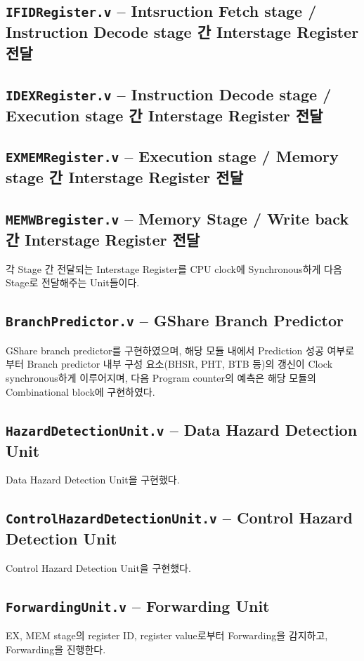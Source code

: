 \documentclass{scrartcl}
\begin{document}
\subsection{\texttt{IFIDRegister.v} -- Intsruction Fetch stage / Instruction Decode stage 간 Interstage Register 전달}
\subsection{\texttt{IDEXRegister.v} -- Instruction Decode stage  / Execution stage 간 Interstage Register 전달}
\subsection{\texttt{EXMEMRegister.v} -- Execution stage / Memory stage 간 Interstage Register 전달}
\subsection{\texttt{MEMWBregister.v} -- Memory Stage / Write back 간 Interstage Register 전달}
각 Stage 간 전달되는 Interstage Register를 CPU clock에 Synchronous하게 다음 Stage로 전달해주는 Unit들이다.

\subsection{\texttt{BranchPredictor.v} -- GShare Branch Predictor}
GShare branch predictor를 구현하였으며, 해당 모듈 내에서 Prediction 성공 여부로부터 Branch predictor 내부 구성 요소(BHSR, PHT, BTB 등)의 갱신이 Clock synchronous하게 이루어지며,
다음 Program counter의 예측은 해당 모듈의 Combinational block에 구현하였다.

\subsection{\texttt{HazardDetectionUnit.v} -- Data Hazard Detection Unit}
Data Hazard Detection Unit을 구현했다.

\subsection{\texttt{ControlHazardDetectionUnit.v} -- Control Hazard Detection Unit}
Control Hazard Detection Unit을 구현했다.

\subsection{\texttt{ForwardingUnit.v} -- Forwarding Unit}
EX, MEM stage의 register ID, register value로부터 Forwarding을 감지하고, Forwarding을 진행한다.
\end{document}
